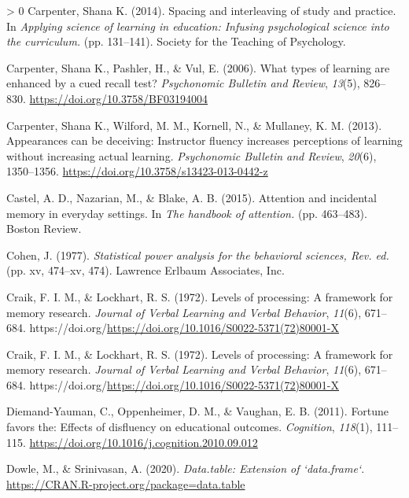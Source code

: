 \documentclass[
  english,
  jou]{apa7}
\newlength{\cslhangindent}
\newenvironment{CSLReferences}[3] %
 {%
  \setlength{\parindent}{0pt}
  \ifodd #1 \everypar{\setlength{\hangindent}{\cslhangindent}}\ignorespaces\fi
  \ifnum #2 > 0
  \setlength{\parskip}{#2\baselineskip}
  \fi
 }%
 {}
\begin{document}
\begin{CSLReferences}{1}{0}
\leavevmode\hypertarget{ref-Carpenter2014}{}%
Carpenter, Shana K. (2014). {Spacing and interleaving of study and practice.} In \emph{Applying science of learning in education: Infusing psychological science into the curriculum.} (pp. 131--141). Society for the Teaching of Psychology.

\leavevmode\hypertarget{ref-Carpenter2006}{}%
Carpenter, Shana K., Pashler, H., \& Vul, E. (2006). {What types of learning are enhanced by a cued recall test?} \emph{Psychonomic Bulletin and Review}, \emph{13}(5), 826--830. \url{https://doi.org/10.3758/BF03194004}

\leavevmode\hypertarget{ref-Carpenter2013}{}%
Carpenter, Shana K., Wilford, M. M., Kornell, N., \& Mullaney, K. M. (2013). {Appearances can be deceiving: Instructor fluency increases perceptions of learning without increasing actual learning}. \emph{Psychonomic Bulletin and Review}, \emph{20}(6), 1350--1356. \url{https://doi.org/10.3758/s13423-013-0442-z}

\leavevmode\hypertarget{ref-Castel2015}{}%
Castel, A. D., Nazarian, M., \& Blake, A. B. (2015). {Attention and incidental memory in everyday settings.} In \emph{The handbook of attention.} (pp. 463--483). Boston Review.

\leavevmode\hypertarget{ref-Cohen1977}{}%
Cohen, J. (1977). \emph{{Statistical power analysis for the behavioral sciences, Rev. ed.}} (pp. xv, 474--xv, 474). Lawrence Erlbaum Associates, Inc.

\leavevmode\hypertarget{ref-Craik1972}{}%
Craik, F. I. M., \& Lockhart, R. S. (1972). {Levels of processing: A framework for memory research}. \emph{Journal of Verbal Learning and Verbal Behavior}, \emph{11}(6), 671--684. https://doi.org/\url{https://doi.org/10.1016/S0022-5371(72)80001-X}

\leavevmode\hypertarget{ref-Craik1972}{}%
Craik, F. I. M., \& Lockhart, R. S. (1972). {Levels of processing: A framework for memory research}. \emph{Journal of Verbal Learning and Verbal Behavior}, \emph{11}(6), 671--684. https://doi.org/\url{https://doi.org/10.1016/S0022-5371(72)80001-X}

\leavevmode\hypertarget{ref-Diemand-Yauman2011}{}%
Diemand-Yauman, C., Oppenheimer, D. M., \& Vaughan, E. B. (2011). {Fortune favors the: Effects of disfluency on educational outcomes}. \emph{Cognition}, \emph{118}(1), 111--115. \url{https://doi.org/10.1016/j.cognition.2010.09.012}

\leavevmode\hypertarget{ref-R-data.table}{}%
Dowle, M., \& Srinivasan, A. (2020). \emph{Data.table: Extension of `data.frame`}. \url{https://CRAN.R-project.org/package=data.table}


\end{CSLReferences}
\end{document}
